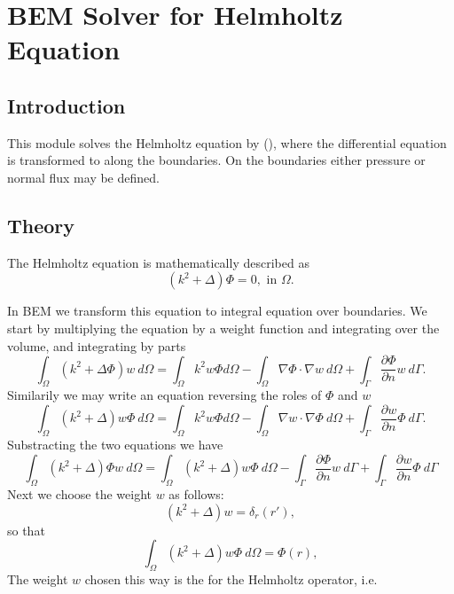 \chapter{BEM Solver for Helmholtz Equation}


\section{Introduction}

This module solves the Helmholtz equation by  (), where
the differential equation is transformed to  along the
boundaries. On the boundaries either pressure or normal flux may be defined.

\section{Theory}

The Helmholtz equation is mathematically described as
\begin{equation}
(k^2+\Delta ) \Phi  = 0, \mbox{ in } \Omega.
\end{equation}

In BEM we transform this equation to integral equation over boundaries. We start
by multiplying the equation by a weight function and integrating over the volume,
and integrating by parts
\begin{equation}
\int_\Omega (k^2+\Delta \Phi) w\ d\Omega  =
\int_\Omega k^2 w\Phi d\Omega -
\int_\Omega \nabla\Phi\cdot \nabla w\ d\Omega +
\int_\Gamma \frac{\partial\Phi}{\partial n} w\ d\Gamma.
\end{equation}
Similarily we may write an equation reversing the roles of $\Phi$ and $w$
\begin{equation}
\int_\Omega (k^2+\Delta) w \Phi\ d\Omega =
\int_\Omega k^2 w\Phi d\Omega -
\int_\Omega \nabla w\cdot \nabla \Phi\ d\Omega  +
\int_\Gamma \frac{\partial w}{\partial n} \Phi\ d\Gamma.
\end{equation}
Substracting the two equations we have
\begin{equation}
\int_\Omega (k^2+\Delta) \Phi w\ d\Omega =
\int_\Omega (k^2+\Delta) w \Phi\ d\Omega -
\int_\Gamma \frac{\partial\Phi}{\partial n} w\ d\Gamma +
\int_\Gamma \frac{\partial w}{\partial n} \Phi\ d\Gamma
\end{equation}
Next we choose the weight $w$ as follows:
\begin{equation}
(k^2+\Delta)w = \delta_r(r'),
\end{equation}
so that 
\begin{equation}
\int_\Omega (k^2+\Delta) w \Phi\ d\Omega = \Phi(r), 
\end{equation}
The weight $w$ chosen this way is the  for the Helmholtz operator,
i.e.

